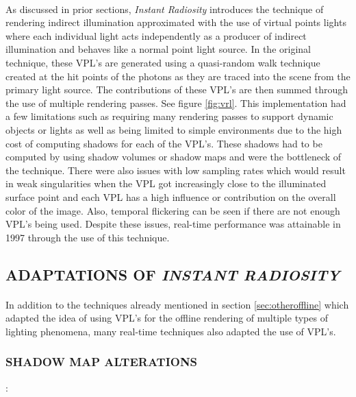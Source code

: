 \paragraph{}
As discussed in prior sections, \textit{Instant Radiosity} introduces the technique of rendering indirect illumination approximated with the use of virtual points lights where each individual light acts independently as a producer of indirect illumination and behaves like a normal point light source.  In the original technique, these VPL's are generated using a quasi-random walk technique created at the hit points of the photons as they are traced into the scene from the primary light source.  The contributions of these VPL's are then summed through the use of multiple rendering passes.  See figure \ref{fig:vrl}. This implementation had a few limitations such as requiring many rendering passes to support dynamic objects or lights as well as being limited to simple environments due to the high cost of computing shadows for each of the VPL's.  These shadows had to be computed by using shadow volumes or shadow maps and were the bottleneck of the technique.  There were also issues with low sampling rates which would result in weak singularities when the VPL got increasingly close to the illuminated surface point and each VPL has a high influence or contribution on the overall color of the image.  Also, temporal flickering can be seen if there are not enough VPL's being used.  Despite these issues, real-time performance was attainable in 1997 through the use of this technique.

\subsection{ADAPTATIONS OF \textit{INSTANT RADIOSITY}}
\paragraph{}
In addition to the techniques already mentioned in section \ref{sec:otheroffline} which adapted the idea of using VPL's for the offline rendering of multiple types of lighting phenomena, many real-time techniques also adapted the use of VPL's.  

\subsubsection{SHADOW MAP ALTERATIONS}: 
